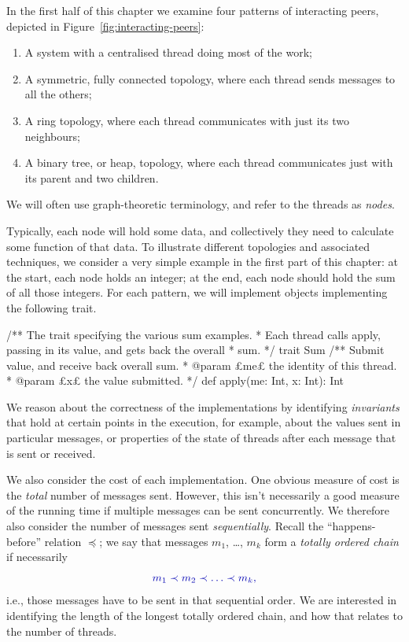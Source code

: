 
In the first half of this chapter we  examine four patterns of interacting
peers, depicted in Figure~\ref{fig:interacting-peers}:
%
\begin{enumerate}
\item[(a)] A system with a centralised thread doing most of the
work;

\item[(b)] A symmetric, fully connected topology, where each thread sends  messages to all the others;

\item[(c)] A ring topology, where each thread
communicates with just its two neighbours;

\item[(d)] A binary tree, or heap, topology, where
each thread communicates just with its parent and two children.
\end{enumerate}
%
We will often use graph-theoretic terminology, and refer to the threads as
\emph{nodes}.  

Typically, each node will hold some data, and collectively they need to
calculate some function of that data.  To illustrate different topologies and
associated techniques, we consider a very simple example in the first part of
this chapter: at the start, each node holds an integer; at the end, each node
should hold the sum of all those integers.
%
For each pattern, we will implement objects implementing the following trait. 
\begin{scala}
/** The trait specifying the various sum examples.
  * Each thread calls apply, passing in its value, and gets back the overall
  * sum. */
trait Sum{
  /** Submit value, and receive back overall sum. 
    * @param £me£ the identity of this thread.
    * @param £x£ the value submitted. */
  def apply(me: Int, x: Int): Int
}
\end{scala}


We  reason about the correctness of the implementations by identifying
\emph{invariants} that hold at certain points in the
execution, for example, about the values sent in particular messages, or
properties of the state of threads after each message that is sent or
received.

We  also consider the cost of each implementation.  One obvious measure of cost
is the \emph{total} number of messages sent.  However, this isn't necessarily
a good measure of the running time if multiple messages can be sent
concurrently.
%
We  therefore also consider the number of messages sent
\emph{sequentially}.  Recall the ``happens-before'' relation $\preceq$; we say
that messages $m_1$, \ldots, $m_k$ form a \emph{totally ordered
chain} if necessarily
\[\mstyle
m_1 \prec m_2 \prec \ldots \prec m_k,
\]
i.e., those messages have to be sent in that sequential order.  We are
interested in identifying the length of the longest totally ordered chain, and
how that relates to the number of threads.

